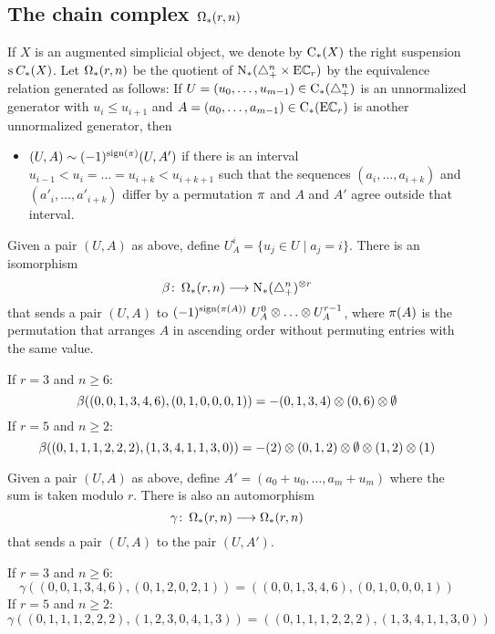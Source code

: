 \subsection{The chain complex \texorpdfstring{$\operatorname{\Omega}_{*}(r,n)$}{Omega(r,n)}} If $X$ is an augmented simplicial object, we denote by $\operatorname{C}_{*}(X)$ the right suspension $\operatorname{s}^{}C_{*}(X)$. Let $\operatorname{\Omega}_{*}(r,n)$ be the quotient of $\operatorname{N}_{*}(\triangle_{+}^{n}\times \mathrm{E}\mathbb{C}_r)$ by the equivalence relation generated as follows: If $U = (u_0,\ldots,u_{m-1})\in \operatorname{C}_{*}(\triangle_{+}^n)$ is an unnormalized generator with $u_i\leq u_{i+1}$ and $A = (a_0,\ldots,a_{m-1})\in \operatorname{C}_{*}(\mathrm{E}\mathbb{C}_r)$ is another unnormalized generator, then
\begin{itemize}
	\item $(U,A)\sim (-1)^{\operatorname{sign}(\pi)}(U,A')$ if there is an interval $u_{i-1}<u_i =\ldots =u_{i+k}<u_{i+k+1}$ such that the sequences $(a_i,\ldots,a_{i+k})$ and $(a'_i,\ldots,a'_{i+k})$ differ by a permutation $\pi$ and $A$ and $A'$ agree outside that interval.
\end{itemize}

Given a pair $(U,A)$ as above, define $U_A^i = \{u_j\in U\mid a_j=i\}$. There is an isomorphism
\[
	\beta \colon  \operatorname{\Omega}_{*}(r,n)\longrightarrow \operatorname{N}_{*}(\triangle_{+}^n)^{ \otimes  r}
\]
that sends a pair $(U,A)$ to $(-1)^{\operatorname{sign}(\pi(A))}\ U_A^0 \otimes  \ldots \otimes  U_A^{r-1}$, where $\pi(A)$ is the permutation that arranges $A$ in ascending order without permuting entries with the same value.
\begin{example}\label{example:beta} If $r=3$ and $n\geq 6$:
\[
		\beta((0,0,1,3,4,6),(0,1,0,0,0,1)) = -(0,1,3,4) \otimes  (0,6) \otimes  \emptyset
	\]
If $r=5$ and $n\geq 2$:
	\[
		\beta((0,1,1,1,2,2,2),(1,3,4,1,1,3,0)) = -(2) \otimes  (0,1,2) \otimes  \emptyset \otimes  (1,2) \otimes  (1)
	\]
	\end{example}



Given a pair $(U,A)$ as above, define $A' = (a_0+u_0,\ldots,a_m+u_m)$ where the sum is taken modulo $r$. There is also an automorphism
\[
	\gamma \colon  \operatorname{\Omega}_{*}(r,n)\longrightarrow \operatorname{\Omega}_{*}(r,n)
\]
that sends a pair $(U,A)$ to the pair $(U,A')$.
	\begin{example}\label{example:gamma} If $r=3$ and $n\geq 6$:
	\[
		\gamma((0,0,1,3,4,6),(0,1,2,0,2,1)) = ((0,0,1,3,4,6),(0,1,0,0,0,1))
	\]
If $r=5$ and $n\geq 2$:
	\[
		\gamma((0,1,1,1,2,2,2),(1,2,3,0,4,1,3)) = ((0,1,1,1,2,2,2),(1,3,4,1,1,3,0))
		\]
\end{example}

